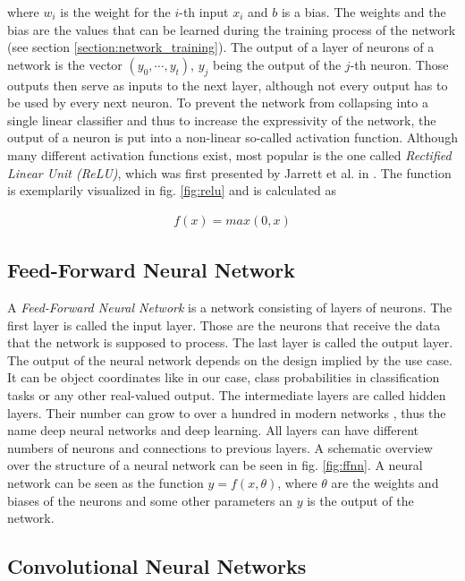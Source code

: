 where $w_i$ is the weight for the $i$-th input $x_i$ and $b$ is a bias. The weights and the bias are the values that can be learned during the training process of the network (see section \ref{section:network_training}). The output of a layer of neurons of a network is the vector $(y_0, \cdots, y_t)$, $y_j$ being the output of the $j$-th neuron. Those outputs then serve as inputs to the next layer, although not every output has to be used by every next neuron. To prevent the network from collapsing into a single linear classifier and thus to increase the expressivity of the network, the output of a neuron is put into a non-linear so-called activation function. Although many different activation functions exist, most popular is the one called \textit{Rectified Linear Unit (ReLU)}, which was first presented by Jarrett et al. in \cite{relu}. The function is exemplarily visualized in fig. \ref{fig:relu} and is calculated as

\begin{align}
f(x) = max(0, x)
\end{align} 

\subsection{Feed-Forward Neural Network}

A \textit{Feed-Forward Neural Network} is a network consisting of layers of neurons. The first layer is called the input layer. Those are the neurons that receive the data that the network is supposed to process. The last layer is called the output layer. The output of the neural network depends on the design implied by the use case. It can be object coordinates like in our case, class probabilities in classification tasks or any other real-valued output. The intermediate layers are called hidden layers. Their number can grow to over a hundred in modern networks \cite{resnet}, thus the name deep neural networks and deep learning. All layers can have different numbers of neurons and connections to previous layers. A schematic overview over the structure of a neural network can be seen in fig. \ref{fig:ffnn}. A neural network can be seen as the function $y=f(x,\theta)$, where $\theta$ are the weights and biases of the neurons and some other parameters an $y$ is the output of the network.

\subsection{Convolutional Neural Networks}

